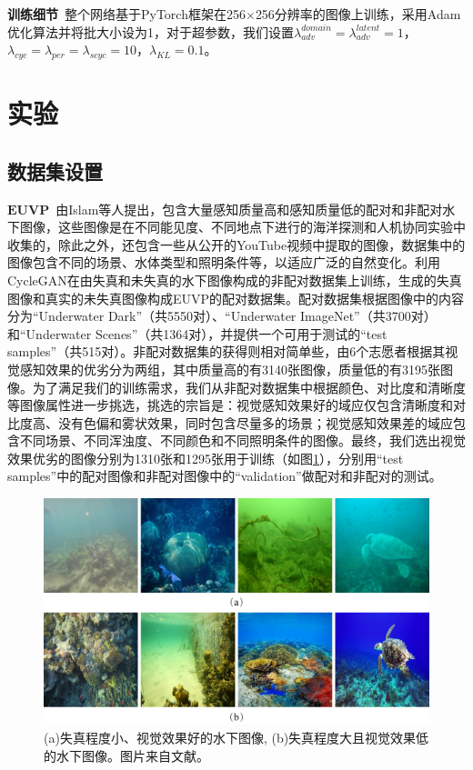 \textbf{训练细节}~整个网络基于PyTorch框架在256$\times$256分辨率的图像上训练，采用Adam\cite{kingma2014adam}优化算法并将批大小设为1，对于超参数，我们设置$\lambda_{adv}^{domain}=\lambda_{adv}^{latent}=1$，$\lambda_{cyc}=\lambda_{per}=\lambda_{scyc}=10$，$\lambda_{KL}=0.1$。

\section{实验}

\subsection{数据集设置}

$\mathbf{EUVP}$~由Islam等人\cite{islam2019fast}提出，包含大量感知质量高和感知质量低的配对和非配对水下图像，这些图像是在不同能见度、不同地点下进行的海洋探测和人机协同实验中收集的，除此之外，还包含一些从公开的YouTube视频中提取的图像，数据集中的图像包含不同的场景、水体类型和照明条件等，以适应广泛的自然变化。利用CycleGAN在由失真和未失真的水下图像构成的非配对数据集上训练，生成的失真图像和真实的未失真图像构成EUVP的配对数据集。配对数据集根据图像中的内容分为“Underwater Dark”（共5550对）、“Underwater ImageNet”（共3700对）和“Underwater Scenes”（共1364对），并提供一个可用于测试的“test samples”（共515对）。非配对数据集的获得则相对简单些，由6个志愿者根据其视觉感知效果的优劣分为两组，其中质量高的有3140张图像，质量低的有3195张图像。为了满足我们的训练需求，我们从非配对数据集中根据颜色、对比度和清晰度等图像属性进一步挑选，挑选的宗旨是：视觉感知效果好的域应仅包含清晰度和对比度高、没有色偏和雾状效果，同时包含尽量多的场景；视觉感知效果差的域应包含不同场景、不同浑浊度、不同颜色和不同照明条件的图像。最终，我们选出视觉效果优劣的图像分别为1310张和1295张用于训练（如图\ref{train}），分别用“test samples”中的配对图像和非配对图像中的“validation”做配对和非配对的测试。

\begin{figure}[ht]
    \centering
	\includegraphics[width=\textwidth]{figs/train.pdf}
	\caption{(a)失真程度小、视觉效果好的水下图像, (b)失真程度大且视觉效果低的水下图像。图片来自文献\cite{islam2019fast}。}
	\label{train}
\end{figure}

